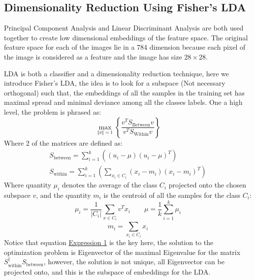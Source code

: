 \documentclass{article}
\begin{document}
    \subsection{Dimensionality Reduction Using Fisher's LDA}
        \hspace{1.1em}
        Principal Component Analysis and Linear Discriminant Analysis are both used together to create low dimensional embeddings of the feature space. The original feature space for each of the images lie in a 784 dimension because each pixel of the image is considered as a feature and the image has size $28 \times 28$. 
        \par
        LDA is both a classifier and a dimensionality reduction technique, here we introduce Fisher's LDA, the idea is to look for a subspace (Not necessary orthogonal) such that, the embeddings of all the samples in the training set has maximal spread and minimal deviance among all the classes labels. One a high level, the problem is phrased as: 
        \begin{equation*}\tag{1}\label{eqn:1}
            \max_{\Vert x\Vert = 1} \left\lbrace
                \frac{v^TS_{\text{Between}}v}{v^TS_{\text{Within}}v}
            \right\rbrace
        \end{equation*}
        Where 2 of the matrices are defined as: 
        \begin{align*}\tag{2}\label{eqn:2}
            S_{\text{between}} = \sum_{i = 1}^{k}\left(
                (u_i - \mu)(u_i - \mu)^T
            \right) \quad 
            \\
            S_{\text{within}} =
            \sum_{i=1}^{k}\left(
                \sum_{x_i\in C_i}^{}
                    (x_i - m_i)(x_i - m_i)^T
            \right)
        \end{align*}
        Where quantity $\mu_i$ denotes the average of the class $C_i$ projected onto the chosen subspace $v$, and the quantity $m_i$ is the centroid of all the samples for the class $C_i$: 
        \begin{equation*}\tag{3}\label{eqn:3}
            \mu_i = \frac{1}{|C_i|}\sum_{x\in C_i}v^Tx_i
            \quad\quad
            \mu = \frac{1}{k}\sum_{i =1}^{k}\mu_i
        \end{equation*}
        \begin{equation*}\tag{4}\label{eqn:4}
            m_i = \sum_{x_i\in C_i}^{}
                x_i
        \end{equation*}
        Notice that equation \hyperref[eqn:1]{Expression 1} is the key here, the solution to the optimization problem is Eigenvector of the maximal Eigenvalue for the matrix $S_{\text{within}}^{\dagger}S_{\text{between}}$, however, the solution is not unique, all Eigenvector can be projected onto, and this is the subspace of embeddings for the LDA. 
\end{document}
